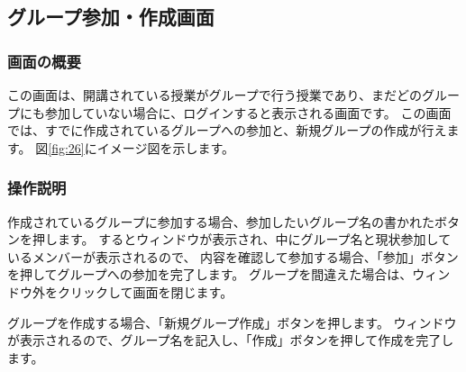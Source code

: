 \newpage

\subsection{グループ参加・作成画面}
\subsubsection{画面の概要}
この画面は、開講されている授業がグループで行う授業であり、まだどのグループにも参加していない場合に、ログインすると表示される画面です。
この画面では、すでに作成されているグループへの参加と、新規グループの作成が行えます。
図\ref{fig:26}にイメージ図を示します。

\subsubsection{操作説明}

作成されているグループに参加する場合、参加したいグループ名の書かれたボタンを押します。
するとウィンドウが表示され、中にグループ名と現状参加しているメンバーが表示されるので、
内容を確認して参加する場合、「参加」ボタンを押してグループへの参加を完了します。
グループを間違えた場合は、ウィンドウ外をクリックして画面を閉じます。

グループを作成する場合、「新規グループ作成」ボタンを押します。
ウィンドウが表示されるので、グループ名を記入し、「作成」ボタンを押して作成を完了します。



